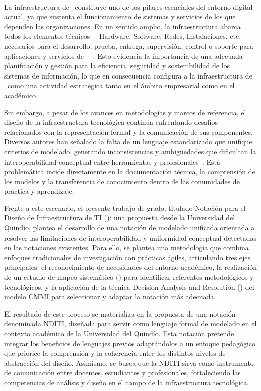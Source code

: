 \label{cap:introduccion}
\mbox{}\\

La infraestructura de \TI~constituye uno de los pilares esenciales del entorno digital actual, ya que sustenta el funcionamiento de sistemas y servicios de los que dependen las organizaciones. En un sentido amplio, la infraestructura abarca todos los elementos técnicos ---Hardware, Software, Redes, Instalaciones, etc.--- necesarios para el desarrollo, prueba, entrega, supervisión, control o soporte para aplicaciones y servicios de \TI~\citep{Axelos01}~. Esto evidencia la importancia de una adecuada planificación y gestión para la eficiencia, seguridad y sostenibilidad de los sistemas de información, lo que en consecuencia configura a la infraestructura de \TI~como una actividad estratégica tanto en el ámbito empresarial como en el académico.

Sin embargo, a pesar de los avances en metodologías y marcos de referencia, el diseño de la infraestructura tecnológica continúa enfrentando desafíos relacionados con la representación formal y la comunicación de sus componentes. Diversos autores han señalado la falta de un lenguaje estandarizado que unifique criterios de modelado, generando inconsistencias y ambigüedades que dificultan la interoperabilidad conceptual entre herramientas y profesionales~\citep{Escobar01, Parviainen01}. Esta problemática incide directamente en la documentación técnica, la comprensión de los modelos y la transferencia de conocimiento dentro de las comunidades de práctica y aprendizaje.

Frente a este escenario, el presente trabajo de grado, titulado Notación para el Diseño de Infraestructura de TI (\NDITI): una propuesta desde la Universidad del Quindío, plantea el desarrollo de una notación de modelado unificada orientada a resolver las limitaciones de interoperabilidad y uniformidad conceptual detectadas en las notaciones existentes. Para ello, se plantea una metodología que combina enfoques tradicionales de investigación con prácticas ágiles, articulando tres ejes principales: el reconocimiento de necesidades del entorno académico, la realización de un estudio de mapeo sistemático (\SMS) para identificar referentes metodológicos y tecnológicos, y la aplicación de la técnica Decision Analysis and Resolution (\DAR) del modelo CMMI para seleccionar y adaptar la notación más adecuada.

El resultado de este proceso se materializa en la propuesta de una notación denominada NDITI, diseñada para servir como lenguaje formal de modelado en el contexto académico de la Universidad del Quindío. Esta notación pretende integrar los beneficios de lenguajes previos adaptándolos a un enfoque pedagógico que priorice la comprensión y la coherencia entre los distintos niveles de abstracción del diseño. Asimismo, se busca que la NDITI sirva como instrumento de comunicación entre docentes, estudiantes y profesionales, fortaleciendo las competencias de análisis y diseño en el campo de la infraestructura tecnológica.